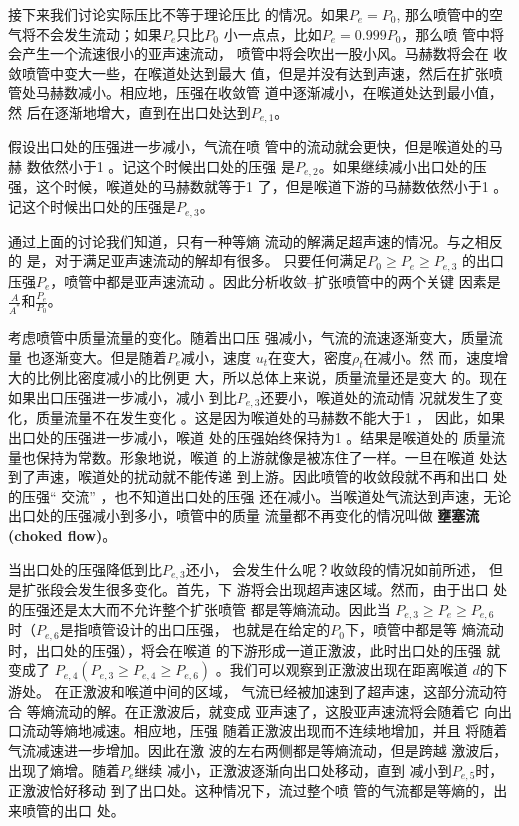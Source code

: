 接下来我们讨论实际压比不等于理论压比
的情况。如果$P_e=P_0$, 那么喷管中的空
气将不会发生流动；如果$P_e$只比$P_0$
小一点点，比如$P_e=0.999P_0$，那么喷
管中将会产生一个流速很小的亚声速流动，
喷管中将会吹出一股小风。马赫数将会在
收敛喷管中变大一些，在喉道处达到最大
值，但是并没有达到声速，然后在扩张喷
管处马赫数减小。相应地，压强在收敛管
道中逐渐减小，在喉道处达到最小值，然
后在逐渐地增大，直到在出口处达到$P_{e,1}$。

假设出口处的压强进一步减小，气流在喷
管中的流动就会更快，但是喉道处的马赫
数依然小于1 。记这个时候出口处的压强
是$P_{e,2} $。如果继续减小出口处的压
强，这个时候，喉道处的马赫数就等于1 
了，但是喉道下游的马赫数依然小于1 。
记这个时候出口处的压强是$P_{e,3}$。

通过上面的讨论我们知道，只有一种等熵
流动的解满足超声速的情况。与之相反的
是，对于满足亚声速流动的解却有很多。
只要任何满足$P_0\geq P_e\geq P_{e,3}$
的出口压强$P_e$，喷管中都是亚声速流动
。因此分析收敛--扩张喷管中的两个关键
因素是$\frac{A}{A^*}$和$\frac{P_e}{P_0}$。

考虑喷管中质量流量的变化。随着出口压
强减小，气流的流速逐渐变大，质量流量
也逐渐变大。但是随着$P_e $减小，速度
$u_t $在变大，密度$\rho_t$在减小。然
而，速度增大的比例比密度减小的比例更
大，所以总体上来说，质量流量还是变大
的。现在如果出口压强进一步减小，减小
到比$P_{e,3} $还要小，喉道处的流动情
况就发生了变化，质量流量不在发生变化
。这是因为喉道处的马赫数不能大于1 ，
因此，如果出口处的压强进一步减小，喉道
处的压强始终保持为1 。结果是喉道处的
质量流量也保持为常数。形象地说，喉道
的上游就像是被冻住了一样。一旦在喉道
处达到了声速，喉道处的扰动就不能传递
到上游。因此喷管的收敛段就不再和出口
处的压强“ 交流” ，也不知道出口处的压强
还在减小。当喉道处气流达到声速，无论
出口处的压强减小到多小，喷管中的质量
流量都不再变化的情况叫做
{\bfseries 壅塞流(choked flow)}。

当出口处的压强降低到比$P_{e,3} $还小，
会发生什么呢？收敛段的情况如前所述，
但是扩张段会发生很多变化。首先，下
游将会出现超声速区域。然而，由于出口
处的压强还是太大而不允许整个扩张喷管
都是等熵流动。因此当
$P_{e,3}\geq P_e \geq P_{e,6}$
时（$P_{e,6}$是指喷管设计的出口压强，
也就是在给定的$P_0$下，喷管中都是等
熵流动时，出口处的压强），将会在喉道
的下游形成一道正激波，此时出口处的压强
就变成了
$P_{e,4}(P_{e,3}\geq P_{e,4}\geq P_{e,6})$
。我们可以观察到正激波出现在距离喉道
$d$的下游处。 在正激波和喉道中间的区域，
气流已经被加速到了超声速，这部分流动符合
等熵流动的解。在正激波后，就变成
亚声速了，这股亚声速流将会随着它
向出口流动等熵地减速。相应地，压强
随着正激波出现而不连续地增加，并且
将随着气流减速进一步增加。因此在激
波的左右两侧都是等熵流动，但是跨越
激波后，出现了熵增。随着$P_e $继续
减小，正激波逐渐向出口处移动，直到
减小到$P_{e,5} $时，正激波恰好移动
到了出口处。这种情况下，流过整个喷
管的气流都是等熵的，出来喷管的出口
处。

